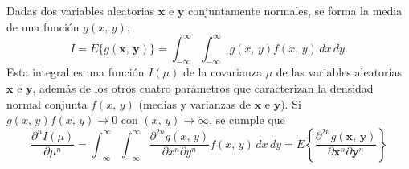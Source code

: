 \documentclass[a4paper]{report}
\newcommand{\x}{\mathbf{x}}
\newcommand{\y}{\mathbf{y}}
\begin{document}
Dadas dos variables aleatorias \(\x\) e \(\y\) conjuntamente normales, se forma la media de una función \(g(x,\,y)\),
\begin{equation}\label{eq:price_theorem_integral}
 I=E\{g(\x,\,\y)\}=\int_{-\infty}^{\infty}\int_{-\infty}^{\infty}g(x,\,y)f(x,\,y)\,dx\,dy.
\end{equation}
Esta integral es una función \(I(\mu)\) de la covarianza \(\mu\) de las variables aleatorias \(\x\) e \(\y\), además de los otros cuatro parámetros que caracterizan la densidad normal conjunta \(f(x,\,y)\) (medias y varianzas de \(\x\) e \(\y\)). Si \(g(x,\,y)f(x,\,y)\to0\) con \((x,\,y)\to\infty\), se cumple que
\begin{equation}\label{eq:price_theorem}
  \frac{\partial^nI(\mu)}{\partial\mu^n}=\int_{-\infty}^{\infty}\int_{-\infty}^{\infty}\frac{\partial^{2n}g(x,\,y)}{\partial x^{n}\partial y^{n}}f(x,\,y)\,dx\,dy=E\left\{\frac{\partial^{2n}g(\x,\,\y)}{\partial \x^{n}\partial \y^{n}}\right\}
\end{equation}
\end{document}
